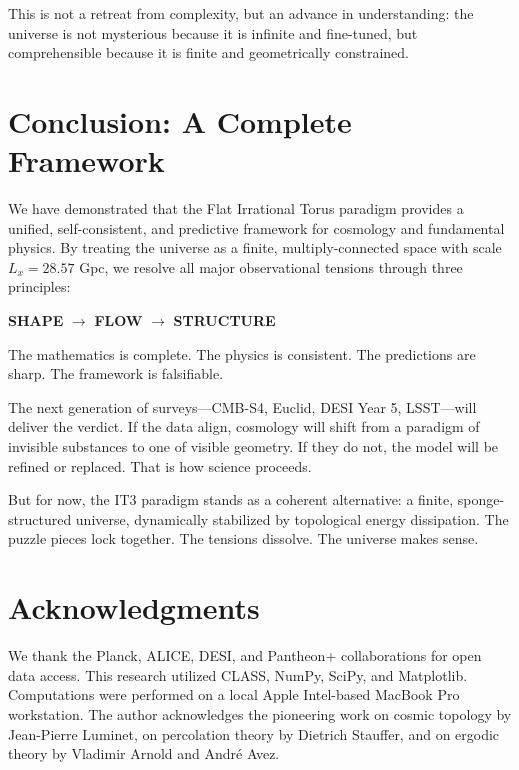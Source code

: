 \documentclass[12pt,a4paper]{article}
\begin{document}
This is not a retreat from complexity, but an advance in understanding: the universe is not mysterious because it is infinite and fine-tuned, but comprehensible because it is finite and geometrically constrained.

\section{Conclusion: A Complete Framework}

We have demonstrated that the Flat Irrational Torus paradigm provides a unified, self-consistent, and predictive framework for cosmology and fundamental physics. By treating the universe as a finite, multiply-connected space with scale $L_x = 28.57$ Gpc, we resolve all major observational tensions through three principles:

\begin{center}
\textbf{SHAPE} $\rightarrow$ \textbf{FLOW} $\rightarrow$ \textbf{STRUCTURE}
\end{center}

The mathematics is complete. The physics is consistent. The predictions are sharp. The framework is falsifiable.

The next generation of surveys---CMB-S4, Euclid, DESI Year 5, LSST---will deliver the verdict. If the data align, cosmology will shift from a paradigm of invisible substances to one of visible geometry. If they do not, the model will be refined or replaced. That is how science proceeds.

But for now, the IT3 paradigm stands as a coherent alternative: a finite, sponge-structured universe, dynamically stabilized by topological energy dissipation. The puzzle pieces lock together. The tensions dissolve. The universe makes sense.

\section*{Acknowledgments}

We thank the Planck, ALICE, DESI, and Pantheon+ collaborations for open data access. This research utilized CLASS, NumPy, SciPy, and Matplotlib. Computations were performed on a local Apple Intel-based MacBook Pro workstation. The author acknowledges the pioneering work on cosmic topology by Jean-Pierre Luminet, on percolation theory by Dietrich Stauffer, and on ergodic theory by Vladimir Arnold and Andr\'e Avez.
\end{document}
